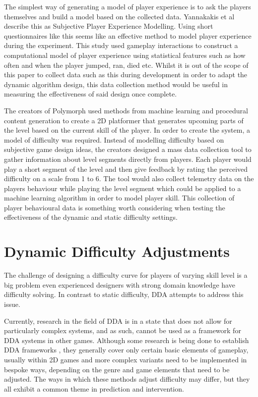 \documentclass[journal]{IEEEtran}
\begin{document}
The simplest way of generating a model of player experience is to ask the players themselves and build a model based on the collected data. Yannakakis et al \cite{yannakakis2012game} describe this as Subjective Player Experience Modelling. Using short questionnaires like this seems like an effective method to model player experience during the experiment. This study \cite{pedersen2009modeling} used gameplay interactions to construct a computational model of player experience using statistical features such as how often and when the player jumped, ran, died etc. Whilst it is out of the scope of this paper to collect data such as this during development in order to adapt the dynamic algorithm design, this data collection method would be useful in measuring the effectiveness of said design once complete.

The creators of Polymorph \cite{jennings2010polymorph} used methods from machine learning and procedural content generation to create a 2D platformer that generates upcoming parts of the level based on the current skill of the player. In order to create the system, a model of difficulty was required. Instead of modelling difficulty based on subjective game design ideas, the creators designed a mass data collection tool to gather information about level segments directly from players. Each player would play a short segment of the level and then give feedback by rating the perceived difficulty on a scale from 1 to 6. The tool would also collect telemetry data on the players behaviour while playing the level segment which could be applied to a machine learning algorithm in order to model player skill. This collection of player behavioural data is something worth considering when testing the effectiveness of the dynamic and static difficulty settings.



\section{Dynamic Difficulty Adjustments}
The challenge of designing a difficulty curve for players of varying skill level is a big problem even experienced designers with strong domain knowledge have difficulty solving. In contrast to static difficulty, DDA attempts to address this issue. 
 
Currently, research in the field of DDA is in a state that does not allow for particularly complex systems, and as such, cannot be used as a framework for DDA systems in other games. Although some research is being done to establish DDA frameworks \cite{zohaib2018dynamic}, they generally cover only certain basic elements of gameplay, usually within 2D games \cite{wheat2013dynamically} and more complex variants need to be implemented in bespoke ways, depending on the genre and game elements that need to be adjusted. The ways in which these methods adjust difficulty may differ, but they all exhibit a common theme in prediction and intervention.
\end{document}
